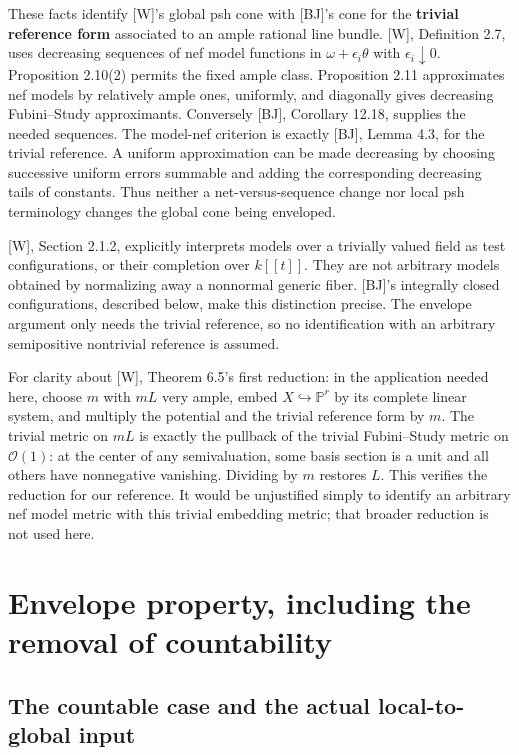 \documentclass[11pt]{article}
\begin{document}
These facts identify {[}W{]}'s global psh cone with {[}BJ{]}'s cone for
the \textbf{trivial reference form} associated to an ample rational line
bundle. {[}W{]}, Definition 2.7, uses decreasing sequences of nef model
functions in \(\omega+\epsilon_i\theta\) with \(\epsilon_i\downarrow0\).
Proposition 2.10(2) permits the fixed ample class. Proposition 2.11
approximates nef models by relatively ample ones, uniformly, and
diagonally gives decreasing Fubini--Study approximants. Conversely
{[}BJ{]}, Corollary 12.18, supplies the needed sequences. The model-nef
criterion is exactly {[}BJ{]}, Lemma 4.3, for the trivial reference. A
uniform approximation can be made decreasing by choosing successive
uniform errors summable and adding the corresponding decreasing tails of
constants. Thus neither a net-versus-sequence change nor local psh
terminology changes the global cone being enveloped.

{[}W{]}, Section 2.1.2, explicitly interprets models over a trivially
valued field as test configurations, or their completion over
\(k[[t]]\). They are not arbitrary models obtained by normalizing away a
nonnormal generic fiber. {[}BJ{]}'s integrally closed configurations,
described below, make this distinction precise. The envelope argument
only needs the trivial reference, so no identification with an arbitrary
semipositive nontrivial reference is assumed.

For clarity about {[}W{]}, Theorem 6.5's first reduction: in the
application needed here, choose \(m\) with \(mL\) very ample, embed
\(X\hookrightarrow\mathbb P^r\) by its complete linear system, and
multiply the potential and the trivial reference form by \(m\). The
trivial metric on \(mL\) is exactly the pullback of the trivial
Fubini--Study metric on \(\mathcal O(1)\): at the center of any
semivaluation, some basis section is a unit and all others have
nonnegative vanishing. Dividing by \(m\) restores \(L\). This verifies
the reduction for our reference. It would be unjustified simply to
identify an arbitrary nef model metric with this trivial embedding
metric; that broader reduction is not used here.

\section{Envelope property, including the removal of
countability}\label{envelope-property-including-the-removal-of-countability}

\subsection{The countable case and the actual local-to-global
input}\label{the-countable-case-and-the-actual-local-to-global-input}
\end{document}
